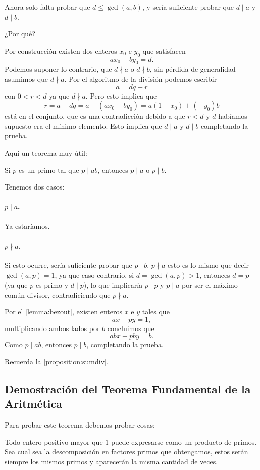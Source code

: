 Ahora solo falta probar que $d \leq \gcd(a, b)$,
y sería suficiente probar que $d \mid a$ y $d \mid b$.
\begin{question*}
	¿Por qué?
\end{question*}
Por construcción existen dos enteros $x_0$ e $y_0$
que satisfacen
\[ax_0 + by_0 = d.\]
Podemos suponer lo contrario, que
$d \nmid a$ o $d \nmid b$, sin pérdida de generalidad
asumimos que $d \nmid a$.
Por el algoritmo de la división
podemos escribir
\[a = dq + r\]
con $0 < r < d$ ya que $d \nmid a$.
Pero esto implica que
\[r = a - dq = a - (ax_0 + by_0) = a(1 - x_0) + (-y_0)b\]
está en el conjunto, que es una contradicción
debido a que $r < d$ y $d$ habíamos supuesto
era el mínimo elemento. Esto implica
que $d \mid a$ y $d \mid b$
completando la prueba.

Aquí un teorema muy útil:
\begin{lemma}
	\label{lemma:euclidprime}
	Si $p$ es un primo tal que $p \mid ab$,
	entonces $p \mid a$ o $p \mid b$.
\end{lemma}
Tenemos dos casos:
\paragraph{$p \mid a$. } Ya estaríamos.
\paragraph{$p \nmid a$. }
Si esto ocurre, sería suficiente
probar que $p \mid b$.
$p \nmid a$ esto es lo mismo
que decir $\gcd (a, p) = 1$,
ya que caso contrario,
si $d = \gcd(a, p) > 1$, entonces $d = p$
(ya que $p$ es primo y $d \mid p$),
lo que implicaría $p \mid p$ y $p \mid a$
por ser el máximo común divisor,
contradiciendo que $p \nmid a$.

Por el \autoref{lemma:bezout},
existen enteros $x$ e $y$ tales que
\[ax + py = 1,\]
multiplicando ambos lados por $b$
concluimos que
\[abx + pby = b.\]
Como $p \mid ab$, entonces $p \mid b$,
completando la prueba.
\begin{remark}
	Recuerda la \autoref{proposition:sumdiv}.
\end{remark}

\subsection{Demostración del Teorema Fundamental de la Aritmética}
Para probar este teorema debemos
probar cosas:
\begin{itemize}
	\ii Todo entero positivo mayor que
	$1$ puede expresarse como un producto de
	primos.
	\ii Sea cual sea la descomposición
	en factores primos que obtengamos,
	estos serán siempre los mismos primos
	y aparecerán la misma cantidad de veces.
\end{itemize}

